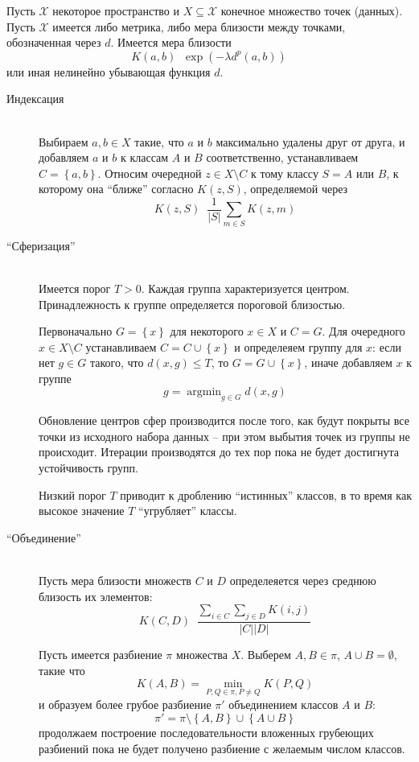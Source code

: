 \documentclass[a4paper]{article}
\newcommand{\obj}[1]{{\left\{ #1 \right \}}}
\newcommand{\brac}[1]{{\left ( #1 \right )}}
\newcommand{\abs}[1]{{\left | #1 \right |}}
\newcommand{\Xcal}{\mathcal{X}}
\newcommand{\defn}{\mathop{\overset{\Delta}{=}}\nolimits}
\begin{document}
Пусть $\Xcal$ некоторое пространство и $X\subseteq \Xcal$ конечное множество точек (данных).
Пусть $\Xcal$ имеется либо метрика, либо мера близости между точками, обозначенная через $d$.
Имеется мера близости \[K(a,b) \defn \exp\brac{ -\lambda d^p(a,b) }\]
или иная нелинейно убывающая функция $d$.
\begin{description}
\item[Индексация] \hfill \\
Выбираем $a,b\in X$ такие, что $a$ и $b$ максимально удалены друг от друга,
и добавляем $a$ и $b$ к классам $A$ и $B$ соответственно,
устанавливаем $C = \obj{a,b}$. 
Относим очередной $z\in X\setminus C$ к тому классу $S=A$ или $B$, к которому она ``ближе'' согласно $K(z,S)$,
определяемой через \[K(z,S) \defn \frac{1}{\abs{S}} \sum_{m\in S} K(z,m)\]

\item[``Сферизация''] \hfill \\
Имеется порог $T>0$. Каждая группа характеризуется центром.
Принадлежность к группе определяется пороговой близостью.

Первоначально $G = \obj{x}$ для некоторого $x\in X$ и $C=G$.
Для очередного $x\in X\setminus C$ устанавливаем $C = C\cup \obj{x}$ и определеяем группу для $x$:
если нет $g\in G$ такого, что $d(x,g)\leq T$, то $G = G\cup \obj{x}$, иначе добавляем $x$ к группе \[g = \mathop{\text{argmin}}_{g\in G} d(x,g)\]

Обновление центров сфер производится после того, как будут покрыты все точки из исходного набора данных -- при этом выбытия точек из группы не происходит.
Итерации производятся до тех пор пока не будет достигнута устойчивость групп.

Низкий порог $T$ приводит к дроблению ``истинных'' классов, в то время как высокое значение $T$ ``угрубляет'' классы.

\item[``Объединение'']\hfill \\
Пусть мера близости множеств $C$ и $D$ определеяется через среднюю близость их элементов: \[K(C,D) \defn \frac{ \sum_{i\in C}\sum_{j\in D} K(i,j)}{\abs{C} \abs{D}}\]

Пусть имеется разбиение $\pi$ множества $X$.
Выберем $A,B\in \pi$, $A\cup B = \emptyset$, такие что \[K(A,B) = \min_{P,Q\in \pi, P\neq Q} K(P,Q)\]
и образуем более грубое разбиение $\pi'$ объединением классов $A$ и $B$: \[\pi ' = \pi\setminus\obj{ A, B } \cup \obj{ A\cup B }\]
продолжаем построение последовательности вложенных грубеющих разбиений пока не будет получено разбиение с желаемым числом классов.


\end{description}
\end{document}
